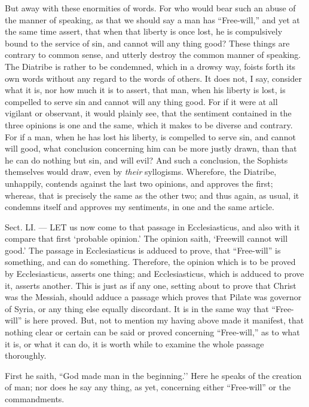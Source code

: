 But away with these enormities of words. For who would bear such an abuse of the manner of speaking, as that we should say a man has “Free-will,” and yet at the same time assert, that when that liberty is once lost, he is compulsively bound to the service of sin, and cannot will any thing good? These things are contrary to common sense, and utterly destroy the common manner of speaking. The Diatribe is rather to be condemned, which in a drowsy way, foists forth its own words without any regard to the words of others. It does not, I say, consider what it is, nor how much it is to assert, that man, when his liberty is lost, is compelled to serve sin and cannot will any thing good. For if it were at all vigilant or observant, it would plainly see, that the sentiment contained in the three opinions is one and the same, which it makes to be diverse and contrary. For if a man, when he has lost his liberty, is compelled to serve sin, and cannot will good, what conclusion concerning him can be more justly drawn, than that he can do nothing but sin, and will evil? And such a conclusion, the Sophists themselves would draw, even by \emph{their }syllogisms. Wherefore, the Diatribe, unhappily, contends against the last two opinions, and approves the first; whereas, that is precisely the same as the other two; and thus again, as usual, it condemns itself and approves my sentiments, in one and the same article.


Sect. LI. — LET us now come to that passage in Ecclesiasticus, and also with it compare that first ‘probable opinion.’ The opinion saith, ‘Freewill cannot will good.’ The passage in Ecclesiasticus is adduced to prove, that “Free-will” is something, and can do something. Therefore, the opinion which is to be proved by Ecclesiasticus, asserts one thing; and Ecclesiasticus, which is adduced to prove it, asserts another. This is just as if any one, setting about to prove that Christ was the Messiah, should adduce a passage which proves that Pilate was governor of Syria, or any thing else equally discordant. It is in the same way that “Free-will” is here proved. But, not to mention my having above made it manifest, that nothing clear or certain can be said or proved concerning “Free-will,” as to what it is, or what it can do, it is worth while to examine the whole passage thoroughly.

First he saith, “God made man in the beginning.’’ Here he speaks of the creation of man; nor does he say any thing, as yet, concerning either “Free-will” or the commandments.

